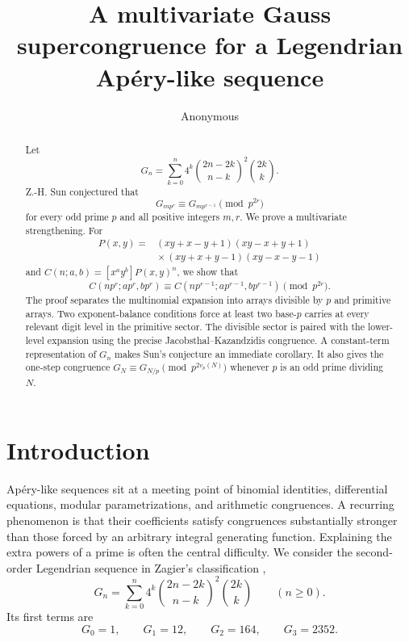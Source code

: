 \documentclass[11pt,reqno]{amsart}
\title[A multivariate Gauss supercongruence]
{A multivariate Gauss supercongruence for a Legendrian
Ap\'ery-like sequence}
\author{Anonymous}
\numberwithin{equation}{section}
\theoremstyle{remark}
\newcommand{\vp}{v_p}
\begin{document}
\begin{abstract}
Let
\[
G_n=\sum_{k=0}^n4^k
\binom{2n-2k}{n-k}^{\!2}\binom{2k}{k}.
\]
Z.-H. Sun conjectured that
\[
G_{mp^r}\equiv G_{mp^{r-1}}\pmod {p^{2r}}
\]
for every odd prime \(p\) and all positive integers \(m,r\).
We prove a multivariate strengthening.  For
\[
\begin{split}
P(x,y)={}&(xy+x-y+1)(xy-x+y+1)\\
&{}\times(xy+x+y-1)(xy-x-y-1)
\end{split}
\]
and \(C(n;a,b)=[x^ay^b]P(x,y)^n\), we show that
\[
C(np^r;ap^r,bp^r)
\equiv C(np^{r-1};ap^{r-1},bp^{r-1})
\pmod {p^{2r}}.
\]
The proof separates the multinomial expansion into arrays divisible by
\(p\) and primitive arrays.  Two exponent-balance conditions force at least
two base-\(p\) carries at every relevant digit level in the primitive
sector.  The divisible sector is paired with the lower-level expansion
using the precise Jacobsthal--Kazandzidis congruence.  A constant-term
representation of \(G_n\) makes Sun's conjecture an immediate corollary.
It also gives the one-step congruence
\(G_N\equiv G_{N/p}\pmod {p^{2\vp(N)}}\) whenever \(p\) is an odd prime
dividing \(N\).
\end{abstract}

\maketitle

\section{Introduction}

Ap\'ery-like sequences sit at a meeting point of binomial identities,
differential equations, modular parametrizations, and arithmetic
congruences.  A recurring phenomenon is that their coefficients satisfy
congruences substantially stronger than those forced by an arbitrary
integral generating function.  Explaining the extra powers of a prime is
often the central difficulty.  We consider the second-order Legendrian
sequence in Zagier's classification \cite{Zagier2009},
\begin{equation}\label{eq:Gdef}
G_n=\sum_{k=0}^n4^k
\binom{2n-2k}{n-k}^{\!2}\binom{2k}{k}
\qquad(n\geq0).
\end{equation}
Its first terms are
\[
G_0=1,\qquad G_1=12,\qquad G_2=164,\qquad G_3=2352.
\]
\end{document}
